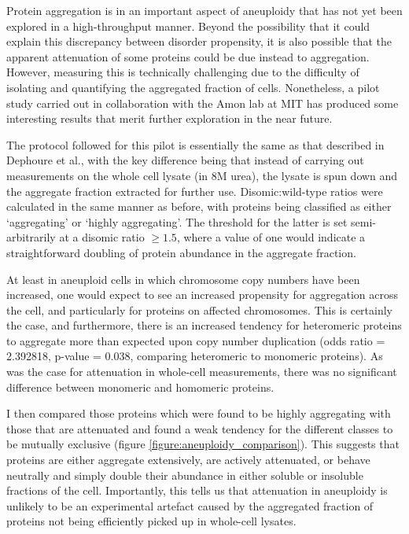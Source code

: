 \documentclass[a4paper,11pt,twoside,openright]{scrbook}
\begin{document}
Protein aggregation is in an important aspect of aneuploidy that has not yet been explored in a high-throughput manner. Beyond the possibility that it could explain this discrepancy between disorder propensity, it is also possible that the apparent attenuation of some proteins could be due instead to aggregation. However, measuring this is technically challenging due to the difficulty of isolating and quantifying the aggregated fraction of cells. Nonetheless, a pilot study carried out in collaboration with the Amon lab at MIT has produced some interesting results that merit further exploration in the near future.

The protocol followed for this pilot is essentially the same as that described in Dephoure et al., with the key difference being that instead of carrying out measurements on the whole cell lysate (in 8M urea), the lysate is spun down and the aggregate fraction extracted for further use. Disomic:wild-type ratios were calculated in the same manner as before, with proteins being classified as either `aggregating' or `highly aggregating'. The threshold for the latter is set semi-arbitrarily at a disomic ratio $\geq 1.5$, where a value of one would indicate a straightforward doubling of protein abundance in the aggregate fraction.

At least in aneuploid cells in which chromosome copy numbers have been increased, one would expect to see an increased propensity for aggregation across the cell, and particularly for proteins on affected chromosomes. This is certainly the case, and furthermore, there is an increased tendency for heteromeric proteins to aggregate more than expected upon copy number duplication (odds ratio = 2.392818, p-value = 0.038, comparing heteromeric to monomeric proteins). As was the case for attenuation in whole-cell measurements, there was no significant difference between monomeric and homomeric proteins.

I then compared those proteins which were found to be highly aggregating with those that are attenuated and found a weak tendency for the different classes to be mutually exclusive (figure \ref{figure:aneuploidy_comparison}). This suggests that proteins are either aggregate extensively, are actively attenuated, or behave neutrally and simply double their abundance in either soluble or insoluble fractions of the cell. Importantly, this tells us that attenuation in aneuploidy is unlikely to be an experimental artefact caused by the aggregated fraction of proteins not being efficiently picked up in whole-cell lysates.
\end{document}
